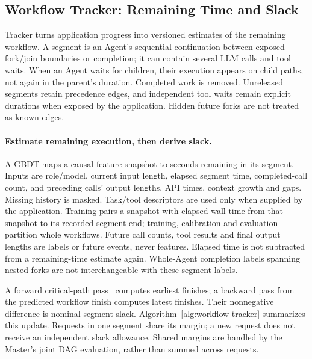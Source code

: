 \subsection{Workflow Tracker: Remaining Time and Slack}
\label{sec:workflow-protection}

Tracker turns application progress into versioned estimates of the
remaining workflow. A segment is an Agent's sequential continuation
between exposed fork/join boundaries or completion; it can contain
several LLM calls and tool waits. When an Agent waits for children, their
execution appears on child paths, not again in the parent's duration.
Completed work is removed. Unreleased segments retain precedence edges,
and independent tool waits remain explicit durations when exposed by
the application. Hidden future forks are not treated as known edges.

\paragraph{Estimate remaining execution, then derive slack.}
A GBDT maps a causal feature snapshot to seconds remaining in its segment.
Inputs are role/model, current input length, elapsed segment time,
completed-call count, and preceding calls' output lengths, API times,
context growth and gaps. Missing history is masked. Task/tool descriptors
are used only when supplied by the application. Training pairs a snapshot
with elapsed wall time from that snapshot to its recorded segment end;
training, calibration and evaluation partition whole workflows. Future
call counts, tool results and final output lengths are labels or future
events, never features. Elapsed time is not subtracted from a remaining-time
estimate again. Whole-Agent completion labels spanning nested forks are
not interchangeable with these segment labels.

A forward critical-path pass~\cite{kelley1959cpm} computes earliest
finishes; a backward pass from the predicted workflow finish computes
latest finishes. Their nonnegative difference is nominal segment slack.
Algorithm~\ref{alg:workflow-tracker} summarizes this update. Requests in one
segment share its margin; a new request does not receive an independent
slack allowance. Shared margins are handled by the Master's joint DAG
evaluation, rather than summed across requests.

